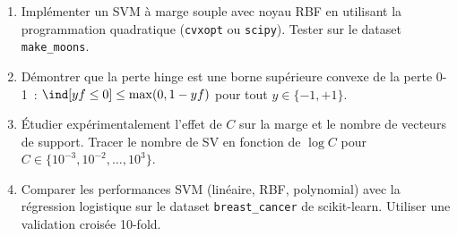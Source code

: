 \begin{exercice}
\begin{enumerate}
  \item Impl\'ementer un SVM \`a marge souple avec noyau RBF en utilisant
    la programmation quadratique (\texttt{cvxopt} ou \texttt{scipy}).
    Tester sur le dataset \texttt{make\_moons}.
  \item D\'emontrer que la perte hinge est une borne sup\'erieure convexe de
    la perte 0-1~: $\ind[yf \leq 0] \leq \max(0, 1 - yf)$ pour tout
    $y \in \{-1, +1\}$.
  \item \'Etudier exp\'erimentalement l'effet de $C$ sur la marge et le nombre
    de vecteurs de support. Tracer le nombre de SV en fonction de $\log C$
    pour $C \in \{10^{-3}, 10^{-2}, \ldots, 10^3\}$.
  \item Comparer les performances SVM (lin\'eaire, RBF, polynomial) avec la
    r\'egression logistique sur le dataset \texttt{breast\_cancer} de
    scikit-learn. Utiliser une validation crois\'ee 10-fold.
\end{enumerate}
\end{exercice}
